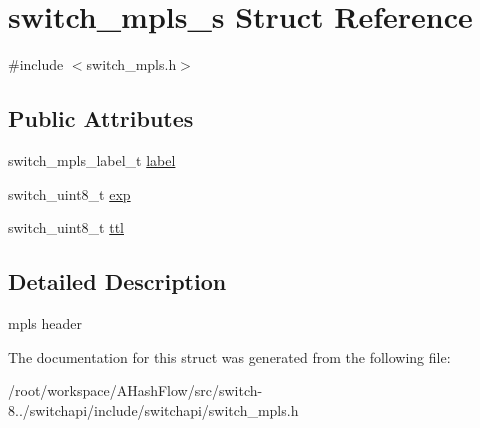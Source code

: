 \hypertarget{structswitch__mpls__s}{\section{switch\+\_\+mpls\+\_\+s Struct Reference}
\label{structswitch__mpls__s}
}


{\ttfamily \#include $<$switch\+\_\+mpls.\+h$>$}

\subsection*{Public Attributes}
\begin{DoxyCompactItemize}
\item 
switch\+\_\+mpls\+\_\+label\+\_\+t \hyperlink{group__Tunnel_ga2c144b7c6e8e43b29bf0fe4cc2075204}{label}
\item 
switch\+\_\+uint8\+\_\+t \hyperlink{group__Tunnel_gaa051a49261e173522f5912b8ba8d0c73}{exp}
\item 
switch\+\_\+uint8\+\_\+t \hyperlink{group__Tunnel_ga0a0835cb20b911ab796b4050f6c6bb49}{ttl}
\end{DoxyCompactItemize}


\subsection{Detailed Description}
mpls header 

The documentation for this struct was generated from the following file\+:\begin{DoxyCompactItemize}
\item 
/root/workspace/\+A\+Hash\+Flow/src/switch-\/8../switchapi/include/switchapi/switch\+\_\+mpls.\+h\end{DoxyCompactItemize}
